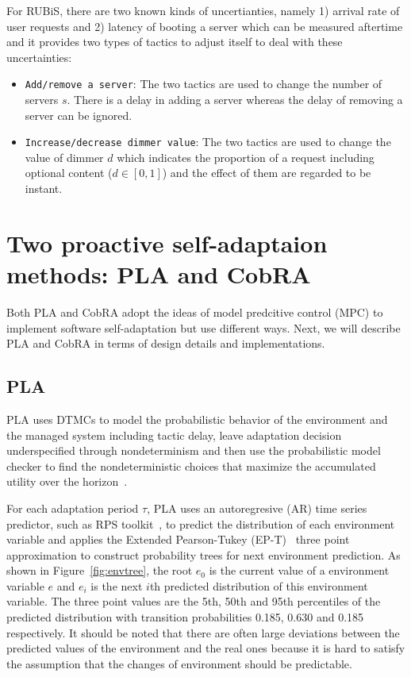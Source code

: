 \documentclass[sigconf]{acmart}
\begin{document}
For RUBiS, there are two known kinds of uncertianties, namely 1) arrival rate of user requests and 2) latency of booting a server which can be measured aftertime and it provides two types of tactics to adjust itself to deal with these uncertainties:
\begin{itemize}
	\item {\verb|Add/remove a server|}:
	The two tactics are used to change the number of servers $s$. There is a delay in adding a server whereas the delay of removing a server can be ignored.
	
	\item  {\verb|Increase/decrease dimmer value|}:
	The two tactics are used to change the value of dimmer $d$ which indicates the proportion of a request including optional content ($d\in[0,1]$) and the effect of them are regarded to be instant. 
\end{itemize}

\section{Two proactive self-adaptaion methods: PLA and CobRA}
Both PLA and CobRA adopt the ideas of model predcitive control (MPC) to implement software self-adaptation but use different ways. Next, we will describe PLA and CobRA in terms of design details and implementations.

\subsection{PLA}
PLA uses DTMCs to model the probabilistic behavior of the environment and the managed system including tactic delay, leave adaptation decision underspecified through nondeterminism and then use the probabilistic model checker to find the nondeterministic choices that maximize the accumulated utility over the horizon~\cite{moreno2015proactive}. 

For each adaptation period $\tau$, PLA uses an autoregresive (AR) time series predictor, such as RPS toolkit~\cite{dinda2006design}, to predict the distribution of each environment variable and applies the Extended Pearson-Tukey (EP-T)~\cite{keefer1994certainty} three point approximation to construct probability trees for next environment prediction. As shown in Figure~\ref{fig:envtree}, the root $e_{0}$ is the current value of a environment variable $e$ and $e_{i}$ is the next $i$th predicted distribution of this environment variable. The three point values are the 5th, 50th and 95th percentiles of the predicted distribution with transition probabilities 0.185, 0.630 and 0.185 respectively. It should be noted that there are often large deviations between the predicted values of the environment and the real ones because it is hard to satisfy the assumption that the changes of environment should be predictable. 
\end{document}
